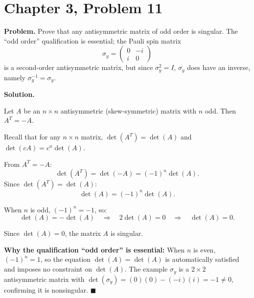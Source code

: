 \documentclass[12pt]{article}
\begin{document}
\section*{Chapter 3, Problem 11}

\textbf{Problem.} Prove that any antisymmetric matrix of odd order is singular. The ``odd order'' qualification is essential; the Pauli spin matrix
\[
\sigma_y = \begin{pmatrix} 0 & -i \\ i & 0 \end{pmatrix}
\]
is a second-order antisymmetric matrix, but since $\sigma_y^2 = I$, $\sigma_y$ does have an inverse, namely $\sigma_y^{-1} = \sigma_y$.

\bigskip
\textbf{Solution.}

Let $A$ be an $n \times n$ antisymmetric (skew-symmetric) matrix with $n$ odd. Then $A^T = -A$.

Recall that for any $n \times n$ matrix, $\det(A^T) = \det(A)$ and $\det(cA) = c^n \det(A)$.

From $A^T = -A$:
\[
\det(A^T) = \det(-A) = (-1)^n \det(A).
\]
Since $\det(A^T) = \det(A)$:
\[
\det(A) = (-1)^n \det(A).
\]

When $n$ is odd, $(-1)^n = -1$, so:
\[
\det(A) = -\det(A) \quad \Longrightarrow \quad 2\det(A) = 0 \quad \Longrightarrow \quad \det(A) = 0.
\]

Since $\det(A) = 0$, the matrix $A$ is singular.

\medskip
\textbf{Why the qualification ``odd order'' is essential:} When $n$ is even, $(-1)^n = 1$, so the equation $\det(A) = \det(A)$ is automatically satisfied and imposes no constraint on $\det(A)$. The example $\sigma_y$ is a $2 \times 2$ antisymmetric matrix with $\det(\sigma_y) = (0)(0) - (-i)(i) = -1 \neq 0$, confirming it is nonsingular. \hfill $\blacksquare$
\end{document}
